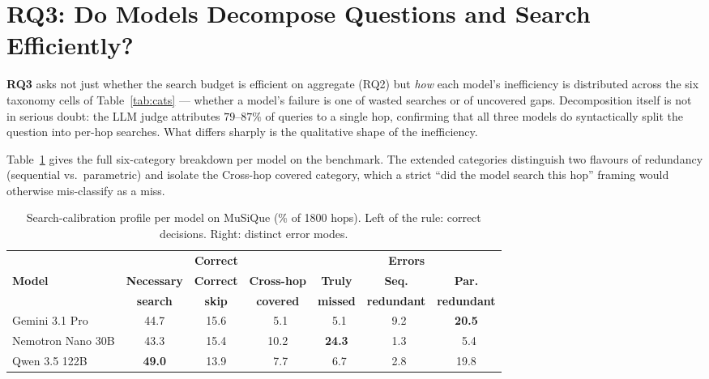 \documentclass[10pt,letterpaper]{article}
\begin{document}
\section{RQ3: Do Models Decompose Questions and Search Efficiently?}\label{sec:profile}

\textbf{RQ3} asks not just whether the search budget is efficient on aggregate (RQ2)
but \emph{how} each model's inefficiency is distributed across the six taxonomy cells
of Table~\ref{tab:cats} --- whether a model's failure is one of wasted searches or of
uncovered gaps. Decomposition itself is not in serious doubt: the LLM judge attributes
$79$--$87\%$ of queries to a single hop, confirming that all three models do
syntactically split the question into per-hop searches. What differs sharply is the
qualitative shape of the inefficiency.

Table~\ref{tab:profile} gives the full six-category breakdown per model on the
benchmark. The extended categories distinguish two flavours of redundancy (sequential
vs.\ parametric) and isolate the Cross-hop covered category, which a strict ``did the
model search this hop'' framing would otherwise mis-classify as a miss.

\begin{table}[ht]
\centering
\small
\caption{Search-calibration profile per model on MuSiQue (\% of 1800 hops). Left of
the rule: correct decisions. Right: distinct error modes.}
\label{tab:profile}
\begin{tabular}{l|ccc|ccc}
\toprule
 & \multicolumn{3}{c|}{\textbf{Correct}} & \multicolumn{3}{c}{\textbf{Errors}} \\
\textbf{Model} & \textbf{Necessary} & \textbf{Correct} & \textbf{Cross-hop} & \textbf{Truly} & \textbf{Seq.} & \textbf{Par.} \\
 & \textbf{search} & \textbf{skip} & \textbf{covered} & \textbf{missed} & \textbf{redundant} & \textbf{redundant} \\
\midrule
Gemini 3.1 Pro       & 44.7 & 15.6 & ~5.1 & ~5.1 & ~9.2 & \textbf{20.5} \\
Nemotron Nano 30B  & 43.3 & 15.4 & 10.2 & \textbf{24.3} & ~1.3 & ~5.4 \\
Qwen 3.5 122B      & \textbf{49.0} & 13.9 & ~7.7 & ~6.7 & ~2.8 & 19.8 \\
\bottomrule
\end{tabular}
\end{table}
\end{document}

